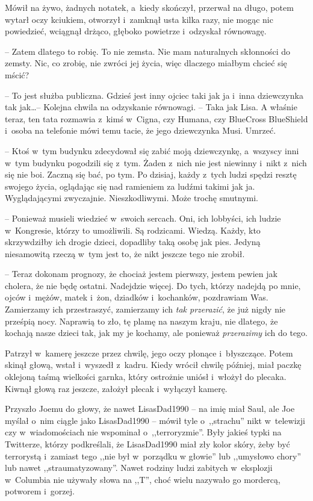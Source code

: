 \documentclass[oneside,polish,11pt,sfheadings]{mwbk}
\begin{document}
Mówił na żywo, żadnych notatek, a~kiedy skończył, przerwał na długo,
potem wytarł oczy kciukiem, otworzył i~zamknął usta kilka razy, nie
mogąc nic powiedzieć, wciągnął drżąco, głęboko powietrze i~odzyskał
równowagę.

-- Zatem dlatego to robię. To nie zemsta. Nie mam naturalnych skłonności
do zemsty. Nic, co zrobię, nie zwróci jej życia, więc dlaczego miałbym
chcieć się mścić?

-- To jest służba publiczna. Gdzieś jest inny ojciec taki jak ja i~inna
dziewczynka tak jak\ldots  -- Kolejna chwila na odzyskanie równowagi. -- Taka
jak Lisa. A właśnie teraz, ten tata rozmawia z~kimś w~Cigna, czy Humana,
czy BlueCross BlueShield i~osoba na telefonie mówi temu tacie, że jego
dziewczynka Musi. Umrzeć.

-- Ktoś w~tym budynku zdecydował się zabić moją dziewczynkę, a~wszyscy
inni w~tym budynku pogodzili się z~tym. Żaden z~nich nie jest niewinny i~nikt z~nich się nie boi. Zaczną się bać, po tym. Po dzisiaj, każdy z~tych ludzi spędzi resztę swojego życia, oglądając się nad ramieniem za
ludźmi takimi jak ja. Wyglądającymi zwyczajnie. Nieszkodliwymi. Może
trochę smutnymi.

-- Ponieważ musieli wiedzieć w~swoich sercach. Oni, ich lobbyści, ich
ludzie w~Kongresie, którzy to umożliwili. Są rodzicami. Wiedzą. Każdy,
kto skrzywdziłby ich drogie dzieci, dopadliby taką osobę jak pies.
Jedyną niesamowitą rzeczą w~tym jest to, że nikt jeszcze tego nie
zrobił.

-- Teraz dokonam prognozy, że chociaż jestem pierwszy, jestem pewien jak
cholera, że nie będę ostatni. Nadejdzie więcej. Do tych, którzy nadejdą
po mnie, ojców i~mężów, matek i~żon, dziadków i~kochanków, pozdrawiam
Was. Zamierzamy ich przestraszyć, zamierzamy ich \textit{tak przerazić},
że już nigdy nie prześpią nocy. Naprawią to zło, tę plamę na naszym
kraju, nie dlatego, że kochają nasze dzieci tak, jak my je kochamy, ale
ponieważ \textit{przerazimy} ich do tego.

Patrzył w~kamerę jeszcze przez chwilę, jego oczy płonące i~błyszczące.
Potem skinął głową, wstał i~wyszedł z~kadru. Kiedy wrócił chwilę
później, miał paczkę oklejoną taśmą wielkości garnka, który ostrożnie
uniósł i~włożył do plecaka. Kiwnął głową raz jeszcze, założył plecak i~wyłączył kamerę.

Przyszło Joemu do głowy, że nawet LisasDad1990 -- na imię miał Saul, ale
Joe myślał o~nim ciągle jako LisasDad1990 -- mówił tyle o~,,strachu''
nikt w~telewizji czy w~wiadomościach nie wspominał o~,,terroryzmie''.
Były jakieś typki na Twitterze, którzy podkreślali, że LisasDad1990 miał
zły kolor skóry, żeby być terrorystą i~zamiast tego ,,nie był w~porządku
w głowie'' lub ,,umysłowo chory'' lub nawet ,,straumatyzowany''. Nawet
rodziny ludzi zabitych w~eksplozji w~Columbia nie używały słowa na
,,T'', choć wielu nazywało go mordercą, potworem i~gorzej.
\end{document}

